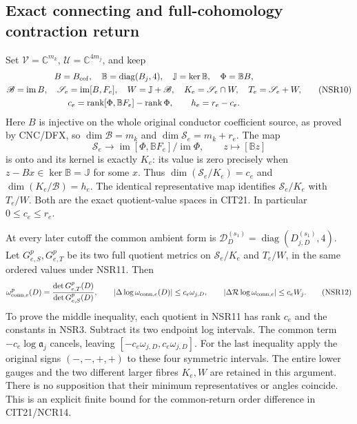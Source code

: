 \documentclass[11pt,a4paper]{article}
\begin{document}
\subsection{Exact connecting and full-cohomology contraction return}
Set $\mathcal V=\mathbb C^{m_k}$,
$\mathcal U=\mathbb C^{4m_j}$, and keep
\[
 \begin{gathered}
 B=B_{\rm cof},\quad \mathbb B=\operatorname{diag}(B_j,4),
 \quad \mathbb J=\ker\mathbb B,\quad \Phi=\mathbb B B,\\
 \mathscr B=\operatorname{im}B,\quad
 \mathscr S_e=\operatorname{im}[B,F_e],\quad
 W=\mathbb J+\mathscr B,\quad
 K_e=\mathscr S_e\cap W,\quad T_e=\mathscr S_e+W,\\
 c_e=\operatorname{rank}[\Phi,\mathbb BF_e]
                      -\operatorname{rank}\Phi,\qquad
 h_e=r_e-c_e .
 \end{gathered}\tag{NSR10}
\]
Here $B$ is injective on the whole original conductor
coefficient source, as proved by CNC/DFX, so
$\dim\mathscr B=m_k$ and $\dim\mathscr S_e=m_k+r_e$.
The map
\[
 \mathscr S_e\longrightarrow
       \operatorname{im}[\Phi,\mathbb BF_e]/\operatorname{im}\Phi,
 \qquad z\longmapsto[\mathbb Bz]
 \tag{NSR11}
\]
is onto and its kernel is exactly $K_e$: its value is zero
precisely when $z-Bx\in\ker\mathbb B=\mathbb J$ for some
$x$. Thus $\dim(\mathscr S_e/K_e)=c_e$ and
$\dim(K_e/\mathscr B)=h_e$. The identical representative
map identifies $\mathscr S_e/K_e$ with $T_e/W$.
Both are the exact quotient-value spaces in CIT21.
In particular $0\le c_e\le r_e$.

At every later cutoff the common ambient form is
$\mathcal D_D^{(s_1)}=\operatorname{diag}(D_{j,D}^{(s_1)},4)$.
Let $G_{e,S}^p,G_{e,T}^p$ be its two full quotient metrics
on $\mathscr S_e/K_e$ and $T_e/W$, in the same ordered
values under NSR11. Then
\[
 \omega_{{\rm conn},e}^p(D)=
            \frac{\det G_{e,T}^p(D)}{\det G_{e,S}^p(D)},\qquad
 \left|\Delta\log\omega_{{\rm conn},e}(D)\right|
                       \le c_e\omega_{j,D},\qquad
 \left|\Delta\mathcal R\log\omega_{{\rm conn},e}\right|
                       \le c_eW_j .
 \tag{NSR12}
\]
To prove the middle inequality, each quotient in NSR11
has rank $c_e$ and the constants in NSR3. Subtract its
two endpoint log intervals. The common term
$-c_e\log\mathfrak a_j$ cancels, leaving
$[-c_e\omega_{j,D},c_e\omega_{j,D}]$.
For the last inequality apply the original signs
$(-,-,+,+)$ to these four symmetric intervals.
The entire lower gauges and the two different larger
fibres $K_e,W$ are retained in this argument.
There is no supposition that their minimum representatives
or angles coincide. This is an explicit finite bound
for the common-return order difference in CIT21/NCR14.
\end{document}
